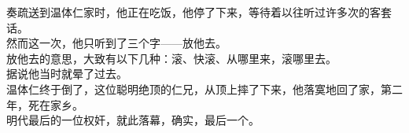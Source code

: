 \begin{multicols}{\theparacolNo}
奏疏送到温体仁家时，他正在吃饭，他停了下来，等待着以往听过许多次的客套话。\\

然而这一次，他只听到了三个字——放他去。\\

放他去的意思，大致有以下几种：滚、快滚、从哪里来，滚哪里去。\\

据说他当时就晕了过去。\\

温体仁终于倒了，这位聪明绝顶的仁兄，从顶上摔了下来，他落寞地回了家，第二年，死在家乡。\\

明代最后的一位权奸，就此落幕，确实，最后一个。\\
\ifnum{}
	\end{multicols}
\fi
\newpage
